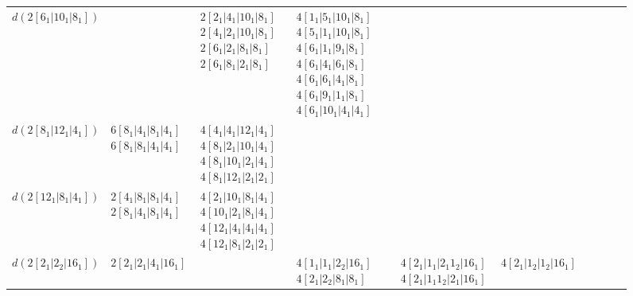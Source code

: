 \begin{figure}
\begin{sideways}
{\begin{tabular}{|c||m{2.5cm}|m{2.5cm}|m{2.5cm}|m{2.5cm}|m{2.5cm}|m{2.5cm}|m{2.5cm}|m{2.5cm}|m{2.5cm}|}
        & %
        & %
        & %
        \\\hline    
        $d(2[ 6_1  | 10_1  | 8_1  ])$
        & %
        & %
        $ 2 [ {2 }_1  | {4 }_1  | {10}_1  | {8 }_1  ] $ 
        $ 2 [ {4 }_1  | {2 }_1  | {10}_1  | {8 }_1  ] $ 
        $ 2 [ {6 }_1  | {2 }_1  | {8 }_1  | {8 }_1  ] $ 
        $ 2 [ {6 }_1  | {8 }_1  | {2 }_1  | {8 }_1  ] $ 
        & %
        $ 4 [ {1 }_1  | {5 }_1  | {10}_1  | {8 }_1  ] $ 
        $ 4 [ {5 }_1  | {1 }_1  | {10}_1  | {8 }_1  ] $ 
        $ 4 [ {6 }_1  | {1 }_1  | {9 }_1  | {8 }_1  ] $ 
        $ 4 [ {6 }_1  | {4 }_1  | {6 }_1  | {8 }_1  ] $ 
        $ 4 [ {6 }_1  | {6 }_1  | {4 }_1  | {8 }_1  ] $ 
        $ 4 [ {6 }_1  | {9 }_1  | {1 }_1  | {8 }_1  ] $ 
        $ 4 [ {6 }_1  | {10}_1  | {4 }_1  | {4 }_1  ] $ 
        & %
        & %
        & %
        & %
        & %
        & %
        \\\hline    
        $d(2[ 8_1  | 12_1  | 4_1  ])$
        & %
        $ 6 [ {8 }_1  | {4 }_1  | {8 }_1  | {4 }_1  ] $ 
        $ 6 [ {8 }_1  | {8 }_1  | {4 }_1  | {4 }_1  ] $ 
        & %
        $ 4 [ {4 }_1  | {4 }_1  | {12}_1  | {4 }_1  ] $ 
        $ 4 [ {8 }_1  | {2 }_1  | {10}_1  | {4 }_1  ] $ 
        $ 4 [ {8 }_1  | {10}_1  | {2 }_1  | {4 }_1  ] $ 
        $ 4 [ {8 }_1  | {12}_1  | {2 }_1  | {2 }_1  ] $ 
        & %
        & %
        & %
        & %
        & %
        & %
        & %
        \\\hline    
        $d(2[ 12_1  | 8_1  | 4_1  ])$
        & %
        $ 2 [ {4 }_1  | {8 }_1  | {8 }_1  | {4 }_1  ] $ 
        $ 2 [ {8 }_1  | {4 }_1  | {8 }_1  | {4 }_1  ] $ 
        & %
        $ 4 [ {2 }_1  | {10}_1  | {8 }_1  | {4 }_1  ] $ 
        $ 4 [ {10}_1  | {2 }_1  | {8 }_1  | {4 }_1  ] $ 
        $ 4 [ {12}_1  | {4 }_1  | {4 }_1  | {4 }_1  ] $ 
        $ 4 [ {12}_1  | {8 }_1  | {2 }_1  | {2 }_1  ] $ 
        & %
        & %
        & %
        & %
        & %
        & %
        & %
        \\\hline    
        $d(2[ 2_1  | 2_2  | 16_1  ])$
        & %
        $ 2 [ {2 }_1  | {2 }_1  | {4 }_1  | {16}_1  ] $ 
        & %
        & %
        $ 4 [ {1 }_1  | {1 }_1  |  {2 }_2 | {16}_1  ] $ 
        $ 4 [ {2 }_1  |  {2 }_2 | {8 }_1  | {8 }_1  ] $ 
        & %
        $ 4 [ {2 }_1  | {1 }_1  | {2 }_1 {1 }_2 | {16}_1  ] $ 
        $ 4 [ {2 }_1  | {1 }_1 {1 }_2 | {2 }_1  | {16}_1  ] $ 
        & %
        $ 4 [ {2 }_1  |  {1 }_2 |  {1 }_2 | {16}_1  ] $ 

\end{tabular}}
\end{sideways}
\end{figure}

